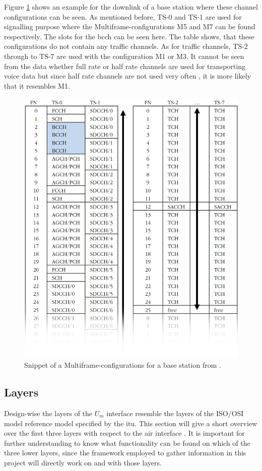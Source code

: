 Figure \ref{fig:channel_example} shows an example \cite{kommsys2006} for the downlink of a base station where these channel configurations can be seen.
As mentioned before, TS-0 and TS-1 are used for signalling purpose where the Multiframe-configurations M5 and M7 can be found respectively.
The slots for the \gls{bcch} can be seen here.
The table shows, that these configurations do not contain any traffic channels.
As for traffic channels, TS-2 through to TS-7 are used with the configuration M1 or M3.
It cannot be seen from the data whether full rate or half rate channels are used for transporting voice data but since half rate channels are not used very often \cite{protocols1999}, it is more likely that it resembles M1.
\begin{figure}
	\centering
	\includegraphics[width=.9\textwidth]{../Images/channel_example}
	\caption{Snippet of a Multiframe-configurations for a base station from \cite{kommsys2006}.}
	\label{fig:channel_example}
\end{figure}

\subsection{Layers}
\label{sec:layers}
Design-wise the layers of the $U_m$ interface resemble the layers of the ISO/OSI model reference model specified by the \gls{itu}.
This section will give a short overview over the first three layers with respect to the air interface \cite{protocols1999}.
It is important for further understanding to know what functionality can be found on which of the three lower layers, since the framework employed to gather information in this project will directly work on and with those layers.


